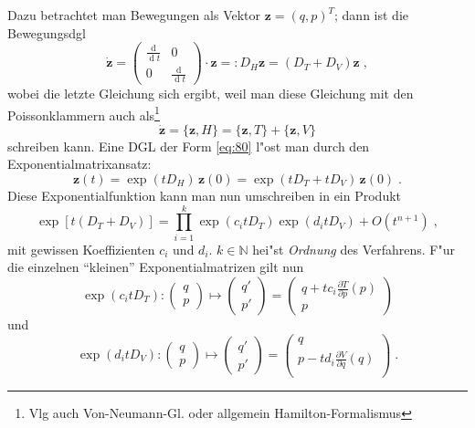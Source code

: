 \documentclass[a4paper]{book}
\newcommand{\diff}{\ensuremath{\operatorname d}}
\renewcommand{\vec}[1]{\ensuremath{\boldsymbol{#1}}}
\begin{document}
Dazu betrachtet man Bewegungen als Vektor $\vec z = (q , p)^T$; dann
ist die Bewegungsdgl
\begin{equation}
  \label{eq:80}
  \dot{\vec z} =
  \begin{pmatrix}
    \frac{\diff }{\diff t} & 0 \\
    0 & \frac{\diff }{\diff t}
  \end{pmatrix} \cdot \vec z
=: D_H \vec z = (D_T + D_V)\vec z \;,
\end{equation}
wobei die letzte Gleichung sich ergibt, weil man diese Gleichung mit
den Poissonklammern auch als\footnote{Vlg auch Von-Neumann-Gl. oder
  allgemein Hamilton-Formalismus}
\begin{equation*}
  \dot{\vec z} = \{ \vec z , H \} = \{ \vec z , T \} + \{\vec z , V \}
\end{equation*}
schreiben kann. Eine DGL der Form \eqref{eq:80} l"ost man durch den
Exponentialmatrixansatz:
\begin{equation}
  \label{eq:81}
  \vec z(t) = \exp( t D_H ) \,\vec z(0) = \exp( t D_T + t D_V ) \,\vec z(0) \;.
\end{equation}
Diese Exponentialfunktion kann man nun umschreiben in ein Produkt
$$
\exp[t (D_T + D_V)] = \prod_{i=1}^k \exp(c_i t D_T)\exp(d_i t
D_V) + O(t^{n+1}) \;,
$$
mit gewissen Koeffizienten $c_i$ und $d_i$. $k \in \mathbb N$ hei"st
\emph{Ordnung} des Verfahrens. F"ur die einzelnen "`kleinen"'
Exponentialmatrizen gilt nun 
$$
\exp(c_i t D_T) : \begin{pmatrix}
q\\ p
\end{pmatrix}
\mapsto
\begin{pmatrix}
q'\\ p'
\end{pmatrix}
=
\begin{pmatrix}
 q + t c_i \frac{\partial T}{\partial p}(p)\\
 p
\end{pmatrix}
$$
und
$$
\exp(d_i t D_V) : \begin{pmatrix}
q\\ p
\end{pmatrix}
\mapsto
\begin{pmatrix}
q'\\ p'
\end{pmatrix}
=
\begin{pmatrix}
 q \\
 p - t d_i \frac{\partial V}{\partial q}(q)\\
\end{pmatrix} \;.
$$
\end{document}
